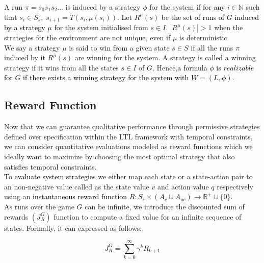 \documentclass[letterpaper, 10 pt, conference]{ieeeconf}  %
\begin{document}
A run $\pi = s_0s_1s_2…$ is induced by a strategy $\phi$ for the system if for any $i \in \mathbb{N}$ such that $s_i \in S_s,\; s_{i+1} = T(s_i, \mu(s_i))$. \textcolor{black}{ Let $R^{\mu}(s)$ be the set of runs of $G$ induced by a strategy $\mu$} for the system initialised from $s \in I$. $|R^{\mu}(s)| > 1$ when the strategies for the environment are not unique, even if $\mu$ is deterministic.\\

We say a strategy $\mu$ is said to win from a given state $s \in S$ if all the runs $\pi$ induced by it $R^{\mu}(s)$ are winning for the system. A strategy is called a winning strategy if it wins from all the states $s \in I$ of $G$.  Hence,\textcolor{black} {a formula $\phi$ is $realizable$ for $G$ if there exists a winning strategy for the system with $W = (L, \phi)$. }

\subsection{Reward Function}

Now that we can guarantee qualitative performance through permissive strategies defined over specification within the LTL framework with temporal constraints, we can consider quantitative evaluations modeled as reward functions which we ideally want to maximize by choosing the most optimal strategy that also satisfies temporal constraints.\\  

\textcolor{black} {To evaluate system strategies} we either map each state or a state-action pair to an non-negative value called as the state value $v$ and action value $q$ respectively using an \textcolor{black} {instantaneous reward function $R : S_s \times (A_c \cup A_{uc}) \rightarrow \mathbb{R}^{+} \cup \{0\}$.}\\

As runs over the game $G$ can be infinite, we introduce the discounted sum of rewards $(J^{G}_R)$ function  to compute a fixed value for an infinite sequence of states. Formally, it can expressed as follows:

\textcolor{black}{
\begin{equation}
    J^{G}_R = \sum_{k=0}^{\infty}  \gamma^k R_{k+1}
\end{equation}}
\end{document}

